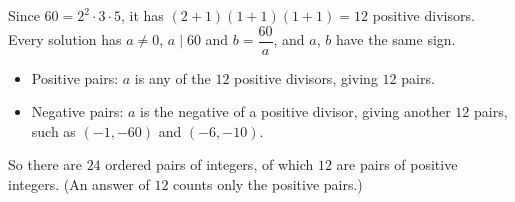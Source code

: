 Since $60=2^2\cdot3\cdot5$, it has $(2+1)(1+1)(1+1)=12$ positive divisors. Every solution has $a\ne0$, $a\mid60$ and $b=\dfrac{60}{a}$, and $a$, $b$ have the same sign.
\begin{itemize}
\item Positive pairs: $a$ is any of the $12$ positive divisors, giving $12$ pairs.
\item Negative pairs: $a$ is the negative of a positive divisor, giving another $12$ pairs, such as $(-1,-60)$ and $(-6,-10)$.
\end{itemize}
So there are $\boxed{24}$ ordered pairs of integers, of which $\boxed{12}$ are pairs of positive integers. (An answer of $12$ counts only the positive pairs.)
